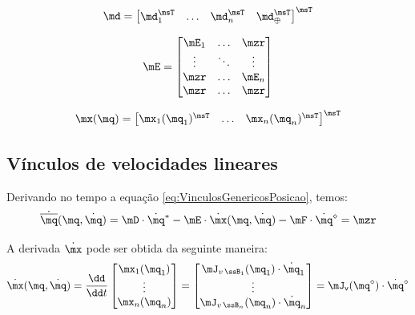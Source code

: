 \documentclass[]{politex}
\begin{document}

\begin{equation}
\md  = \begin{bmatrix}
\md_1^\msT &
\hdots &
\md_n^\msT &
\md_{\oplus}^\msT
\end{bmatrix}^\msT
\end{equation}

\begin{equation}
\mE = \begin{bmatrix}
\mE_1 & \ldots & \mzr\\
\vdots & \ddots & \vdots\\
\mzr &\ldots  & \mE_{n} \\
\mzr &\ldots  & \mzr
\end{bmatrix}
\end{equation}

\begin{equation}
\mx(\mq) = 
\begin{bmatrix}
\mx_1(\mq_1)^\msT &
\hdots &
\mx_n(\mq_n)^\msT
\end{bmatrix}^\msT
\end{equation}

\subsection{Vínculos de velocidades lineares} 

Derivando no tempo a equação \eqref{eq:VinculosGenericosPosicao}, temos:
\begin{equation} \label{eq:VinculosGenericosVel}
\dot{\overline{\mq}}(\mq,\dot{\mq}) = \mD \cdot \dot{\mq}^\ast - \mE \cdot \dot{\mx}(\mq,\dot{\mq}) - \mF \cdot \dot{\mq}^\diamond = \mzr
\end{equation}


A derivada $\dot{\mx}$ pode ser obtida da seguinte maneira:
\begin{equation} \label{eq:dxdt}
\dot{\mx}(\mq,\dot{\mq}) = \frac{\dd}{\dd t}
\begin{bmatrix}
\mx_1(\mq_1) \\
\vdots \\
\mx_n(\mq_n)
\end{bmatrix} =
\begin{bmatrix}
\mJ_{v\,\ssB_1}(\mq_1) \cdot \dot{\mq}_1 \\
\vdots \\
\mJ_{v\,\ssB_n}(\mq_n) \cdot \dot{\mq}_n
\end{bmatrix}
=
\mJ_{\mathsf{v}}(\mq^\diamond) \cdot \dot{\mq}^\diamond
\end{equation}
\end{document}
